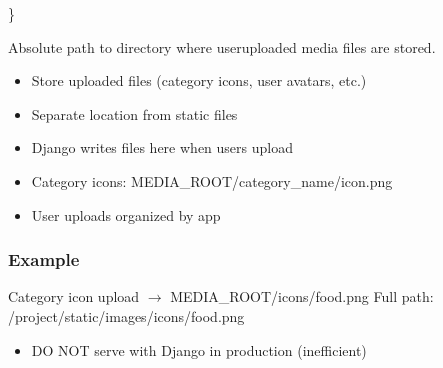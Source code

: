 \documentclass[letterpaper,10pt,english]{sphinxmanual}
\begin{document}
\begin{fulllineitems}
\begin{description}
\begin{description}
\end{description}

\sphinxAtStartPar
\}

\end{description}

\end{fulllineitems}


\begin{fulllineitems}
\label{\detokenize{softwareProject:softwareProject.settings.MEDIA_ROOT}}
\pysigstartsignatures
\pysigline
{}
\pysigstopsignatures
\sphinxAtStartPar
Absolute path to directory where user\sphinxhyphen{}uploaded media files are stored.
\begin{description}
\begin{itemize}
\item {} 
\sphinxAtStartPar
Store uploaded files (category icons, user avatars, etc.)

\item {} 
\sphinxAtStartPar
Separate location from static files

\item {} 
\sphinxAtStartPar
Django writes files here when users upload

\end{itemize}

\begin{itemize}
\item {} 
\sphinxAtStartPar
Category icons: MEDIA\_ROOT/category\_name/icon.png

\item {} 
\sphinxAtStartPar
User uploads organized by app

\end{itemize}

\end{description}
\subsubsection*{Example}

\sphinxAtStartPar
Category icon upload \(\rightarrow\) MEDIA\_ROOT/icons/food.png
Full path: /project/static/images/icons/food.png
\begin{description}
\begin{itemize}
\item {} 
\sphinxAtStartPar
DO NOT serve with Django in production (inefficient)


\end{itemize}
\end{description}
\end{fulllineitems}
\end{document}
